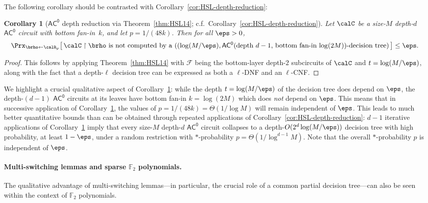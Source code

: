 \documentclass[11pt]{article}
\numberwithin{equation}{section}
\newtheorem{corollary}[theorem]{Corollary}
\theoremstyle{definition}
\theoremstyle{plain}
\theoremstyle{plain}
\newcommand{\acz}{\mathsf{AC^0}}
\newcommand{\uhr}{\upharpoonright}
\renewcommand{\F}{\mathds{F}}
\begin{document}
The following corollary should be contrasted with Corollary~\ref{cor:HSL-depth-reduction}:

\begin{corollary}[$\acz$ depth reduction via Theorem~\ref{thm:HSL14}; c.f.~Corollary~\ref{cor:HSL-depth-reduction}] 
\label{cor:HSL14-depth-reduction}
Let $\calC$ be a size-$M$ depth-$d$ $\acz$ circuit with bottom fan-in~$k$, and let $p = 1/(48k)$.  Then for all $\eps > 0$,
\[ \Prx_{\brho\leftarrow\calR_p}\big[\, \text{$\calC \uhr \brho$ is not computed by a $((\log(M/\eps),\acz(\text{depth $d-1$, bottom fan-in $\log (2M)$})$-decision tree})\,\big] \le \eps.\] 
\end{corollary}

\begin{proof}
This follows by applying Theorem~\ref{thm:HSL14} with $\mathscr{F}$ being the bottom-layer depth-$2$ subcircuits of $\calC$ and $t = \log(M/\eps)$, along with the fact that a depth-$\ell$ decision tree can be expressed as both a $\ell$-DNF and an $\ell$-CNF. 
\end{proof} 



We highlight a crucial qualitative aspect of Corollary~\ref{cor:HSL14-depth-reduction}: while the depth $t=\log(M/\eps)$ of the decision tree does depend on $\eps$, the depth-$(d-1)$ $\acz$ circuits at its leaves have bottom fan-in $k = \log(2M)$ which does \emph{not} depend on $\eps$.  This means that in successive application of Corollary~\ref{cor:HSL14-depth-reduction}, the values of $p = 1/(48k) = \Theta(1/\log M)$ will remain independent of $\eps$. This leads to much better quantitative bounds than can be obtained through repeated applications of Corollary~\ref{cor:HSL-depth-reduction}: $d-1$ iterative applications of Corollary~\ref{cor:HSL14-depth-reduction} imply  that every size-$M$ depth-$d$ $\acz$ circuit collapses to a depth-$O(2^d\log(M/\eps))$ decision tree with high probability, at least $1-\eps$, under a random restriction with $\ast$-probability $p = \Theta(1/\log^{d-1} M)$. Note that the overall $\ast$-probability $p$ is independent of $\eps$.


\vspace{-5pt} 
\paragraph{Multi-switching lemmas and sparse $\F_2$ polynomials.} The qualitative advantage of multi-switching lemmas---in particular, the crucial role of a common partial decision tree---can also be seen within the context of $\F_2$ polynomials.  
\end{document}
